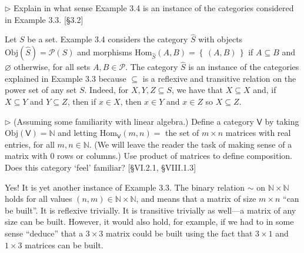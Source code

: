 \documentclass[12pt,letterpaper,boxed]{hmcpset}
\newcommand{\Obj}{\mathrm{Obj}}
\newcommand{\Hom}{\mathrm{Hom}}
\newcommand{\set}[1]{\left\{\,#1\,\right\}}
\begin{document}
\begin{problem}[3.5]
	$\rhd$ Explain in what sense Example 3.4 is an instance of the categories
	considered in Example 3.3. [\S 3.2]
\end{problem}
\begin{solution}
	Let $S$ be a set. Example 3.4 considers the category $\hat{S}$ with objects
	$\Obj(\hat{S}) = \mathscr{P}(S)$ and morphisms $\Hom_{\hat{S}}(A,B) =
	\set{(A,B)}$ if $A\subseteq B$ and $\varnothing$ otherwise, for all sets
	$A,B\in\mathscr{P}$. The category $\hat{S}$ is an instance of the categories
	explained in Example 3.3 because $\subseteq$ is a reflexive and transitive
	relation on the power set of any set $S$. Indeed, for $X,Y,Z\subseteq S$, we have
	that $X\subseteq X$ and, if $X\subseteq Y$ and $Y\subseteq Z$, then if $x\in X$,
	then $x\in Y$ and $x\in Z$ so $X\subseteq Z$.
\end{solution}


\begin{problem}[3.6]
	$\rhd$ (Assuming some familiarity with linear algebra.) Define a category
	$\mathsf{V}$ by taking $\Obj(\mathsf{V}) = \mathbb{N}$ and letting
	$\Hom_{\mathsf{V}}(m,n) = $ the set of $m\times n$ matrices with real
	entries, for all $m,n\in\mathbb{N}$. (We will leave the reader the task of
	making sense of a matrix with 0 rows or columns.) Use product of matrices to
	define composition. Does this category `feel' familiar? [\S VI.2.1, \S VIII.1.3]
\end{problem}
\begin{solution}
	Yes! It is yet another instance of Example 3.3. The binary relation $\sim$ on
	$\mathbb{N} \times \mathbb{N}$ holds for all values $(n,m)\in\mathbb{N} \times
	\mathbb{N}$, and means that a matrix of size $m\times n$ ``can be built''. It is
	reflexive trivially. It is transitive trivially as well---a matrix of any size
	can be built. However, it would also hold, for example, if we had to in some
	sense ``deduce'' that a $3\times 3$ matrix could be built using the fact that
	$3\times 1$ and $1\times 3$ matrices can be built.
\end{solution}
\end{document}
